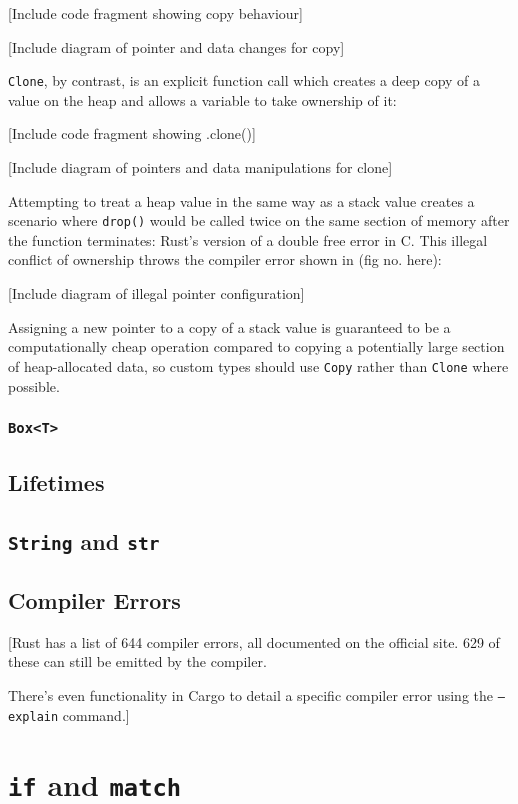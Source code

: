 \documentclass{l4proj}
\begin{document}
[Include code fragment showing copy behaviour]

[Include diagram of pointer and data changes for copy]

\texttt{Clone}, by contrast, is an explicit function call which creates a deep copy of a value on the heap and allows a variable to take ownership of it:

[Include code fragment showing .clone()] 

[Include diagram of pointers and data manipulations for clone]

Attempting to treat a heap value in the same way as a stack value creates a scenario where \texttt{drop()} would be called twice on the same section of memory after the function terminates: Rust's version of a double free error in C.\cite{double-free} This illegal conflict of ownership throws the compiler error shown in (fig no. here):

[Include diagram of illegal pointer configuration]

Assigning a new pointer to a copy of a stack value is guaranteed to be a computationally cheap operation compared to copying a potentially large section of heap-allocated data, so custom types should use \texttt{Copy} rather than \texttt{Clone} where possible.

\subsubsection{\texttt{Box<T>}}

\subsection{Lifetimes}

\subsection{\texttt{String} and \texttt{str}}

\subsection{Compiler Errors}
[Rust has a list of 644 compiler errors, all documented on the official site.\cite{compiler-error-list} 629 of these can still be emitted by the compiler.

There's even functionality in Cargo to detail a specific compiler error using the \texttt{--explain} command.]

\section{\texttt{if} and \texttt{match}}
\end{document}
